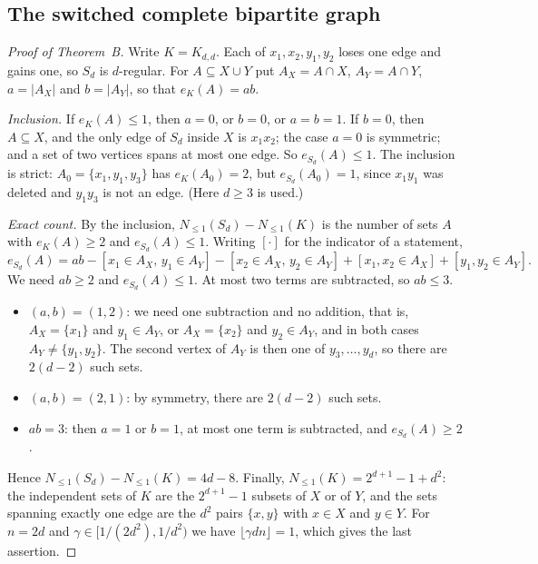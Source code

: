 \documentclass[11pt]{article}
\theoremstyle{remark}
\newcommand{\Nle}[1]{N_{\le #1}}
\begin{document}
\subsection{The switched complete bipartite graph}
\begin{proof}[Proof of Theorem~B]
Write $K=K_{d,d}$. Each of $x_1,x_2,y_1,y_2$ loses one edge and gains one, so
$S_d$ is $d$-regular. For $A\subseteq X\cup Y$ put $A_X=A\cap X$,
$A_Y=A\cap Y$, $a=|A_X|$ and $b=|A_Y|$, so that $e_K(A)=ab$.

\emph{Inclusion.} If $e_K(A)\le1$, then $a=0$, or $b=0$, or $a=b=1$. If
$b=0$, then $A\subseteq X$, and the only edge of $S_d$ inside $X$ is
$x_1x_2$; the case $a=0$ is symmetric; and a set of two vertices spans at most
one edge. So $e_{S_d}(A)\le1$. The inclusion is strict: $A_0=\{x_1,y_1,y_3\}$
has $e_K(A_0)=2$, but $e_{S_d}(A_0)=1$, since $x_1y_1$ was deleted and
$y_1y_3$ is not an edge. (Here $d\ge3$ is used.)

\emph{Exact count.} By the inclusion, $\Nle1(S_d)-\Nle1(K)$ is the number of
sets $A$ with $e_K(A)\ge2$ and $e_{S_d}(A)\le1$. Writing $[\cdot]$ for the
indicator of a statement,
\[
 e_{S_d}(A)=ab-[x_1\in A_X,\,y_1\in A_Y]-[x_2\in A_X,\,y_2\in A_Y]
 +[x_1,x_2\in A_X]+[y_1,y_2\in A_Y].
\]
We need $ab\ge2$ and $e_{S_d}(A)\le1$. At most two terms are subtracted, so
$ab\le3$.
\begin{itemize}
\item $(a,b)=(1,2)$: we need one subtraction and no addition, that is,
 $A_X=\{x_1\}$ and $y_1\in A_Y$, or $A_X=\{x_2\}$ and $y_2\in A_Y$, and in
 both cases $A_Y\ne\{y_1,y_2\}$. The second vertex of $A_Y$ is then one of
 $y_3,\dots,y_d$, so there are $2(d-2)$ such sets.
\item $(a,b)=(2,1)$: by symmetry, there are $2(d-2)$ such sets.
\item $ab=3$: then $a=1$ or $b=1$, at most one term is subtracted, and
 $e_{S_d}(A)\ge2$.
\end{itemize}
Hence $\Nle1(S_d)-\Nle1(K)=4d-8$. Finally, $\Nle1(K)=2^{d+1}-1+d^2$: the
independent sets of $K$ are the $2^{d+1}-1$ subsets of $X$ or of $Y$, and
the sets spanning exactly one edge are the $d^2$ pairs $\{x,y\}$ with $x\in X$
and $y\in Y$. For $n=2d$ and $\gamma\in[1/(2d^2),1/d^2)$ we have
$\lfloor\gamma dn\rfloor=1$, which gives the last assertion.
\end{proof}
\end{document}
